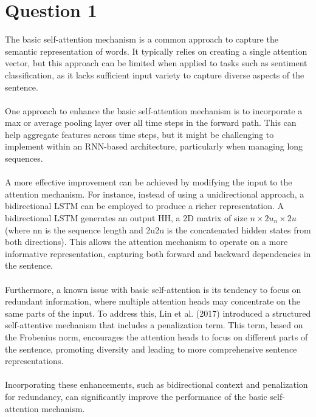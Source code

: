 \documentclass[a4paper]{article}
\begin{document}



\section{Question 1}

\noindent
The basic self-attention mechanism is a common approach to capture the semantic representation
of words. It typically relies on creating a single attention vector, but this approach can be
limited when applied to tasks such as sentiment classification, as it lacks
sufficient input variety to capture diverse aspects of the sentence.
\\
\\
\noindent
One approach to enhance the basic self-attention mechanism is to incorporate a max or
average pooling layer over all time steps in the forward path. This can help aggregate
features across time steps, but it might be challenging to implement within an RNN-based
architecture, particularly when managing long sequences.
\\
\\
\noindent
A more effective improvement can be achieved by modifying the input to the attention mechanism.
For instance, instead of using a unidirectional approach, a bidirectional LSTM can
be employed to produce a richer representation. A bidirectional LSTM generates an output HH,
a 2D matrix of size $n \times 2 u_n \times 2 u$ (where nn is the sequence length and 2u2u is the concatenated hidden states
from both directions). This allows the attention mechanism to operate on a more informative
representation, capturing both forward and backward dependencies in the sentence.
\\
\\
\noindent
Furthermore, a known issue with basic self-attention is its tendency to focus on redundant
information, where multiple attention heads may concentrate on the same parts of
the input. To address this, Lin et al. (2017) \cite{Lin} introduced a structured self-attentive mechanism that
includes a penalization term. This term, based on the Frobenius norm, encourages the
attention heads to focus on different parts of the sentence, promoting diversity and leading
to more comprehensive sentence representations.
\\
\\
\noindent
Incorporating these enhancements, such as bidirectional context and penalization for
redundancy, can significantly improve the performance of the basic self-attention mechanism.
\end{document}

